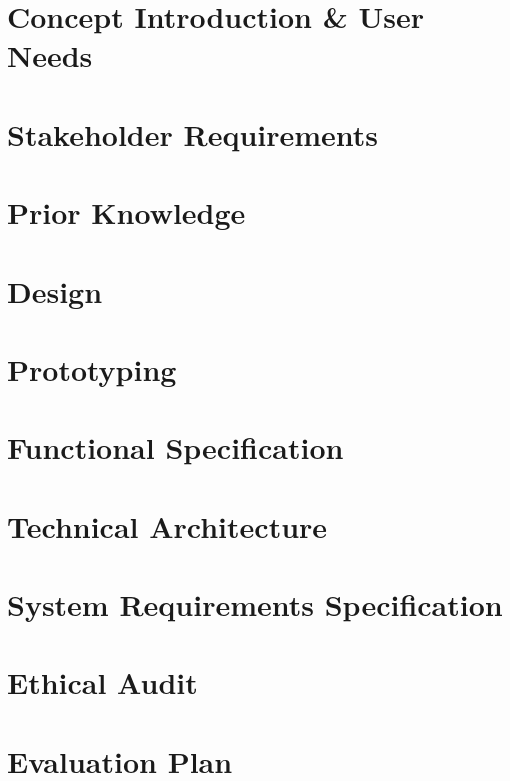 \documentclass[12pt]{report}
\begin{document}
\chapter{Concept Introduction \& User Needs}


\chapter{Stakeholder Requirements}


\chapter{Prior Knowledge}


\chapter{Design}


\chapter{Prototyping}


\chapter{Functional Specification}


\chapter{Technical Architecture}


\chapter{System Requirements Specification}


\chapter{Ethical Audit}


\chapter{Evaluation Plan}

\end{document}
